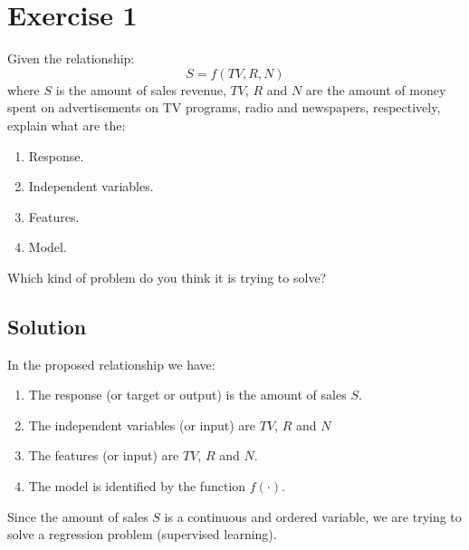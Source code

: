 \section{Exercise 1}

Given the relationship:
\[S = f(T V, R, N)\]
where $S$ is the amount of sales revenue, $T V$, $R$ and $N$ are the amount of money spent on advertisements on TV programs, radio and newspapers, respectively, explain what are the:
\begin{enumerate}
    \item Response. 
    \item Independent variables. 
    \item Features. 
    \item Model. 
\end{enumerate}
Which kind of problem do you think it is trying to solve?

\subsection*{Solution}
In the proposed relationship we have:
\begin{enumerate}
    \item The response (or target or output) is the amount of sales $S$. 
    \item The independent variables (or input) are $T V$, $R$ and $N$
    \item The features (or input) are $T V$, $R$ and $N$. 
    \item The model is identified by the function $f(\cdot)$.
\end{enumerate}
Since the amount of sales $S$ is a continuous and ordered variable, we are trying to solve a regression problem (supervised learning).